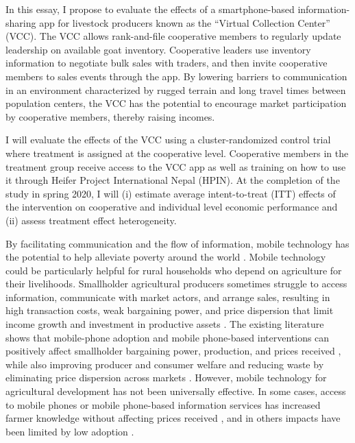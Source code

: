 \documentclass[11pt]{article}
\begin{document}
In this essay, I propose to evaluate the effects of a smartphone-based information-sharing app for livestock producers known as the ``Virtual Collection Center'' (VCC). The VCC allows rank-and-file cooperative members to regularly update leadership on available goat inventory. Cooperative leaders use inventory information to negotiate bulk sales with traders, and then invite cooperative members to sales events through the app. By lowering barriers to communication in an environment characterized by rugged terrain and long travel times between population centers, the VCC has the potential to encourage market participation by cooperative members, thereby raising incomes. 

I will evaluate the effects of the VCC using a cluster-randomized control trial where treatment is assigned at the cooperative level. Cooperative members in the treatment group receive access to the VCC app as well as training on how to use it through Heifer Project International Nepal (HPIN). At the completion of the study in spring 2020, I will (i) estimate average intent-to-treat (ITT) effects of the intervention on cooperative and individual level economic performance and (ii) assess treatment effect heterogeneity.

By facilitating communication and the flow of information, mobile technology has the potential to help alleviate poverty around the world \citep{aker-et.al.16}. Mobile technology could be particularly helpful for rural households who depend on agriculture for their livelihoods. Smallholder agricultural producers sometimes struggle to access information, communicate with market actors, and arrange sales, resulting in high transaction costs, weak bargaining power, and price dispersion that limit income growth and investment in productive assets \citep{staal-et.al.97}. The existing literature shows that mobile-phone adoption and mobile phone-based interventions can positively affect smallholder bargaining power, production, and prices received \citep{cole-fernando12,curtois-subervie14,muto-yamano09,nakasone13,shimamoto-et.al.15}, while also improving producer and consumer welfare and reducing waste by eliminating price dispersion across markets \citep{aker10,jensen07}. However, mobile technology for agricultural development has not been universally effective. In some cases, access to mobile phones or mobile phone-based information services has increased farmer knowledge without affecting prices received \citep{aker-ksoll16,camacho-conover11}, and in others impacts have been limited by low adoption \citep{fafchamps-minten12,muto-yamano09}. 
\end{document}
